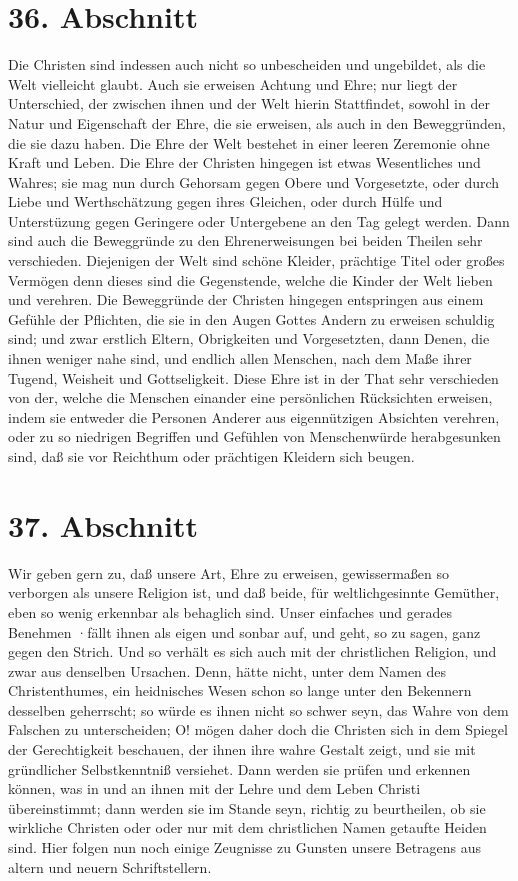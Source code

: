 \section{36. Abschnitt}

Die Christen sind indessen auch nicht so unbescheiden und ungebildet, als die Welt vielleicht glaubt. Auch sie erweisen Achtung und Ehre; nur liegt der Unterschied, der zwischen ihnen und der Welt hierin Stattfindet, sowohl in der Natur und Eigenschaft der Ehre, die sie erweisen, als auch in den Beweggründen, die sie dazu haben. Die Ehre der Welt bestehet in einer leeren Zeremonie ohne Kraft und Leben. Die Ehre der Christen hingegen ist etwas Wesentliches und Wahres; sie mag nun durch Gehorsam gegen Obere und Vorgesetzte, oder durch Liebe und Werthschätzung gegen ihres Gleichen, oder durch Hülfe und Unterstüzung gegen Geringere oder Untergebene an den Tag gelegt werden. Dann sind auch die Beweggründe zu den Ehrenerweisungen bei beiden Theilen sehr verschieden. Diejenigen der Welt sind schöne Kleider, prächtige Titel oder großes Vermögen denn dieses sind die Gegenstende, welche die Kinder der Welt lieben und verehren. Die Beweggründe der Christen hingegen entspringen aus einem Gefühle der Pflichten, die sie in den Augen Gottes Andern zu erweisen schuldig sind; und zwar erstlich Eltern, Obrigkeiten und Vorgesetzten, dann Denen, die ihnen weniger nahe sind, und endlich allen Menschen, nach dem Maße ihrer Tugend, Weisheit und Gottseligkeit. Diese Ehre ist in der That sehr verschieden von der, welche die Menschen einander eine persönlichen Rücksichten erweisen, indem sie entweder die Personen Anderer aus eigennützigen Absichten verehren, oder zu so niedrigen Begriffen und Gefühlen von Menschenwürde herabgesunken sind, daß sie vor Reichthum oder prächtigen Kleidern sich beugen.

\section{37. Abschnitt}

Wir geben gern zu, daß unsere Art, Ehre zu erweisen, gewissermaßen so verborgen als unsere Religion ist, und daß beide, für weltlichgesinnte Gemüther, eben so wenig erkennbar als behaglich sind. Unser einfaches und gerades Benehmen ·fällt ihnen als eigen und sonbar auf, und geht, so zu sagen, ganz gegen den Strich. Und so verhält es sich auch mit der christlichen Religion, und zwar aus denselben Ursachen. Denn, hätte nicht, unter dem Namen des Christenthumes, ein heidnisches Wesen schon so lange unter den Bekennern desselben geherrscht; so würde es ihnen nicht so schwer seyn, das Wahre von dem Falschen zu unterscheiden; O! mögen daher doch die Christen sich in dem Spiegel der Gerechtigkeit beschauen, der ihnen ihre wahre Gestalt zeigt, und sie mit gründlicher Selbstkenntniß versiehet. Dann werden sie prüfen und erkennen können, was in und an ihnen mit der Lehre und dem Leben Christi übereinstimmt; dann werden sie im Stande seyn, richtig zu beurtheilen, ob sie wirkliche Christen oder oder nur mit dem christlichen Namen getaufte Heiden sind. Hier folgen nun noch einige Zeugnisse zu Gunsten unsere Betragens aus altern und neuern Schriftstellern.

